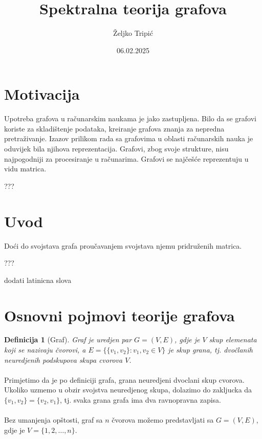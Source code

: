 \documentclass[11pt]{article}
\title{Spektralna teorija grafova}
\author{Željko Tripić}
\date{06.02.2025}
\newtheorem{definition}{Definicija}
\begin{document}
	\maketitle
	
	\section{Motivacija}
	Upotreba grafova u računarskim naukama je jako zastupljena. Bilo da se grafovi koriste za skladištenje podataka, 
	kreiranje grafova znanja za nepredna pretraživanje. Izazov prilikom rada sa grafovima u oblasti računarskih nauka je oduvijek
	bila njihova reprezentacija. Grafovi, zbog svoje strukture, nisu najpogodniji za procesiranje u računarima.
	Grafovi se najčešće reprezentuju u vidu matrica.

    ???
	
	\section{Uvod}
	Doći do svojstava grafa proučavanjem svojstava njemu pridruženih matrica. 

    ???

    dodati latinicna slova
	
	\section{Osnovni pojmovi teorije grafova}
	
		\begin{definition}[Graf]
		Graf je uredjen par $G = (V, E)$, gdje je $V$ skup elemenata koji se nazivaju čvorovi, a $E = \{ \{v_1, v_2\} : v_1, v_2 \in V \}$ je skup grana, tj. dvočlanih neuredjenih podskupova skupa cvorova $V$.
		\end{definition}
	
        \paragraph{}
        Primjetimo da je po definiciji grafa, grana neuredjeni dvoclani skup cvorova. Ukoliko uzmemo u obzir svojstva neuredjenog skupa, dolazimo do zakljucka da $\{v_1,v_2\} = \{v_2, v_1\}$, tj. svaka grana grafa ima dva ravnopravna zapisa.
    
        \paragraph{}
        Bez umanjenja opštosti, graf sa $n$ čvorova možemo predstavljati sa $G = (V, E)$, gdje je $V = \{1, 2, \dots, n\}$.
	
\end{document}
